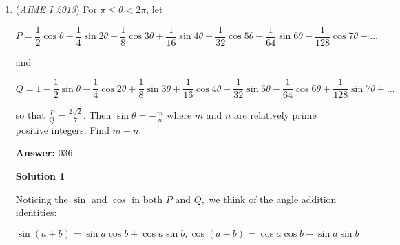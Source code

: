 \begin{enumerate}
 The required area is $[AB_0C_0 ] – [Y] = [AB_0C_0 ] \cdot (1 –  \frac{1}{2 – k^2}) = [AB_0C_0 ] \cdot \frac  {1 –  k^2}{2 – k^2} = [AB_0C_0 ] \cdot \frac {25^2 – 17^2} {2 \cdot 25^2 – 17^2} =  [AB_0C_0 ] \cdot  \frac {336}{961}.$

 The number $961$ is prime, $[AB_0C_0]$ is integer but not $961,$ therefore the answer is $\boxed{961}$.

 \textbf{vladimir.shelomovskii@gmail.com, vvsss}

 


 


 


	\item (\textit{AIME I 2013}) For $\pi \le \theta < 2\pi$, let


 
 \[P=\dfrac12\cos\theta-\dfrac14\sin2\theta-\dfrac18\cos3\theta+\dfrac1{16}\sin4\theta+\dfrac1{32}\cos5\theta-\dfrac1{64}\sin6\theta-\dfrac1{128}\cos7\theta+\ldots\]


 and


 
 \[Q=1-\dfrac12\sin\theta-\dfrac14\cos2\theta+\dfrac1{8}\sin3\theta+\dfrac1{16}\cos4\theta-\dfrac1{32}\sin5\theta-\dfrac1{64}\cos6\theta+\dfrac1{128}\sin7\theta +\ldots\]


 so that $\frac{P}{Q} = \frac{2\sqrt2}{7}$. Then $\sin\theta = -\frac{m}{n}$ where $m$ and $n$ are relatively prime positive integers. Find $m+n$.


 
 \textbf{Answer: }036



\textbf{Solution 1}

Noticing the $\sin$ and $\cos$ in both $P$ and $Q,$ we think of the angle addition identities: 

 
 \[\sin(a + b) = \sin a \cos b + \cos a \sin b, \cos(a + b) = \cos a \cos b - \sin a \sin b\]


\end{enumerate}

